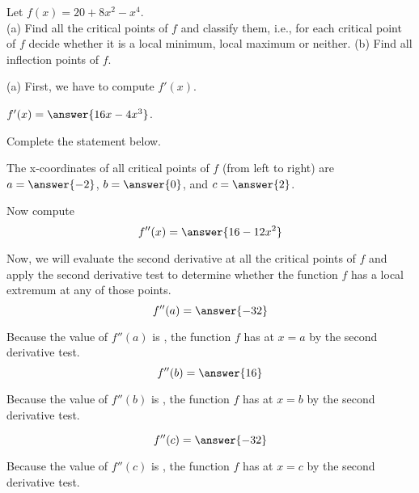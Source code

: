 \documentclass{ximera}
\begin{document}
\author{Nela Lakos}



\begin{exercise}

Let $f(x) = 20 + 8x^2 - x^4$.\\
(a) Find all the critical points of $f$ and classify them, i.e., for each critical point of $f$ decide whether it is a local minimum, local maximum or neither.
(b) Find all inflection points of $f$.

(a) First, we have to compute $f'(x)$.

$f'(x) = \answer{16x-4x^3}$.

Complete the statement below.

The  x-coordinates of all critical points of $f$ (from left to right) are $a=\answer{-2}$, $b=\answer{0}$, and $c=\answer{2}$.




\begin{exercise}
Now compute
\[
f''(x)=\answer{16-12x^2}
\]

Now, we will evaluate the second derivative at all the critical points of $f$ and apply the second derivative test to determine whether the function $f$ has a local extremum at any of those points.
\[
f''(a)=\answer{-32}
\]
\begin{exercise}
Because the value of $f''(a)$ is , the function $f$ has   at $x=a$ by the second derivative test.
\[
f''(b)=\answer{16}
\]
\begin{exercise}
Because the value of $f''(b)$ is , the function $f$ has  at $x=b$ by the second derivative test.

\[
f''(c)=\answer{-32}
\]
\begin{exercise}
Because the value of $f''(c)$ is , the function $f$ has at $x=c$  by the second derivative test.\\



\end{exercise}
\end{exercise}
\end{exercise}
\end{exercise}
\end{exercise}
\end{document}

